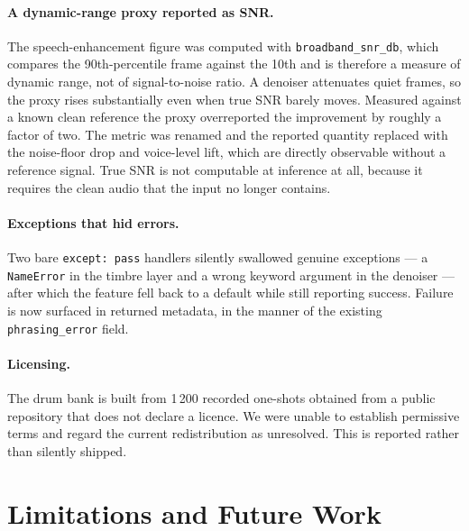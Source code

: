 \documentclass[conference]{IEEEtran}
\begin{document}
\paragraph{A dynamic-range proxy reported as SNR.}
The speech-enhancement figure was computed with \texttt{broadband\_snr\_db},
which compares the 90th-percentile frame against the 10th and is therefore a
measure of dynamic range, not of signal-to-noise ratio. A denoiser attenuates
quiet frames, so the proxy rises substantially even when true SNR barely
moves. Measured against a known clean reference the proxy overreported the
improvement by roughly a factor of two. The metric was renamed and the reported
quantity replaced with the noise-floor drop and voice-level lift, which are
directly observable without a reference signal. True SNR is not computable at
inference at all, because it requires the clean audio that the input no longer
contains.

\paragraph{Exceptions that hid errors.}
Two bare \texttt{except: pass} handlers silently swallowed genuine exceptions ---
a \texttt{NameError} in the timbre layer and a wrong keyword argument in the
denoiser --- after which the feature fell back to a default while still
reporting success. Failure is now surfaced in returned metadata, in the manner
of the existing \texttt{phrasing\_error} field.

\paragraph{Licensing.}
The drum bank is built from 1\,200 recorded one-shots obtained from a public
repository that does not declare a licence. We were unable to establish
permissive terms and regard the current redistribution as unresolved. This is
reported rather than silently shipped.

\section{Limitations and Future Work}
\end{document}
